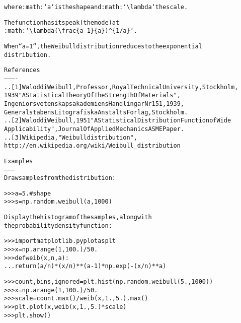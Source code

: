 \begin{boxedminipage}{\funcwidth}
\begin{alltt}
where :math:`a` is the shape and :math:`{\textbackslash}lambda` the scale.

The function has its peak (the mode) at
:math:`{\textbackslash}lambda({\textbackslash}frac\{a-1\}\{a\}){\textasciicircum}\{1/a\}`.

When ``a = 1``, the Weibull distribution reduces to the exponential
distribution.

References
----------
.. [1] Waloddi Weibull, Professor, Royal Technical University, Stockholm,
       1939 "A Statistical Theory Of The Strength Of Materials",
       Ingeniorsvetenskapsakademiens Handlingar Nr 151, 1939,
       Generalstabens Litografiska Anstalts Forlag, Stockholm.
.. [2] Waloddi Weibull, 1951 "A Statistical Distribution Function of Wide
       Applicability",  Journal Of Applied Mechanics ASME Paper.
.. [3] Wikipedia, "Weibull distribution",
       http://en.wikipedia.org/wiki/Weibull\_distribution

Examples
--------
Draw samples from the distribution:

{\textgreater}{\textgreater}{\textgreater} a = 5. \# shape
{\textgreater}{\textgreater}{\textgreater} s = np.random.weibull(a, 1000)

Display the histogram of the samples, along with
the probability density function:

{\textgreater}{\textgreater}{\textgreater} import matplotlib.pyplot as plt
{\textgreater}{\textgreater}{\textgreater} x = np.arange(1,100.)/50.
{\textgreater}{\textgreater}{\textgreater} def weib(x,n,a):
...     return (a / n) * (x / n)**(a - 1) * np.exp(-(x / n)**a)

{\textgreater}{\textgreater}{\textgreater} count, bins, ignored = plt.hist(np.random.weibull(5.,1000))
{\textgreater}{\textgreater}{\textgreater} x = np.arange(1,100.)/50.
{\textgreater}{\textgreater}{\textgreater} scale = count.max()/weib(x, 1., 5.).max()
{\textgreater}{\textgreater}{\textgreater} plt.plot(x, weib(x, 1., 5.)*scale)
{\textgreater}{\textgreater}{\textgreater} plt.show()
\end{alltt}

\setlength{\parskip}{1ex}
    \end{boxedminipage}

    \label{trunk:qstkutil:bollinger:zipf}

    \vspace{0.5ex}

